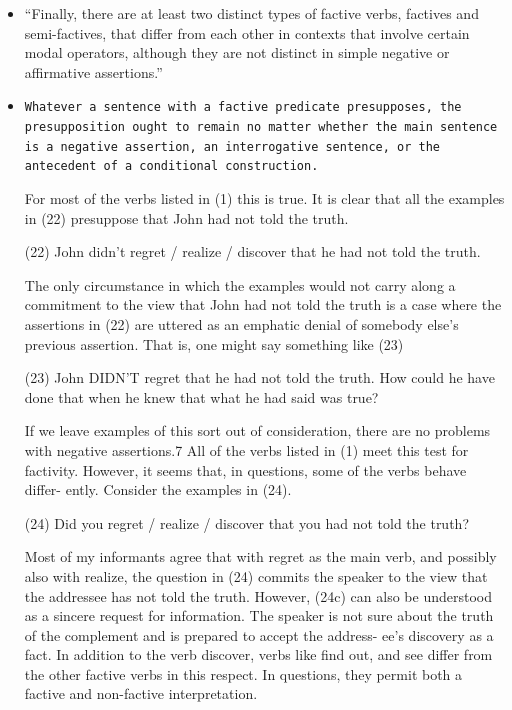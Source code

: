 \documentclass[11pt,fleqn]{article}
\newcommand{\6}{\mbox{$[\hspace*{-.6mm}[$}}
\newcommand{\9}{\mbox{$]\hspace*{-.6mm}]$}}
\begin{document}
\begin{itemize}

\item \citealt[65]{karttunen71b}

``Finally, there are at least two distinct types of factive verbs, factives and semi-factives, that differ from each other in contexts that involve certain modal operators, although they are not distinct in simple negative or affirmative assertions.''

\item \citealt[63ff.]{karttunen71b}

{\tt Whatever a sentence with a factive predicate presupposes, the presupposition ought to remain no matter whether the
main sentence is a negative assertion, an interrogative sentence, or the antecedent of a conditional construction.

For most of the verbs listed in (1) this is true. It is clear that all the examples in (22) presuppose that John had not told the truth.

(22) John didn't regret / realize / discover that he had not told the truth.

The only circumstance in which the examples would not carry along a commitment to the view that John had not told the truth is a case where the assertions in (22) are uttered as an emphatic denial of somebody else's previous assertion. That is, one might say something like (23)

(23) John DIDN'T regret that he had not told the truth. How could he have done that when he knew that what he had said was true?

If we leave examples of this sort out of consideration, there are no problems with negative assertions.7 All of the verbs listed in (1) meet this test for factivity. However, it seems that, in questions, some of the verbs behave differ- ently. Consider the examples in (24).

(24) Did you regret / realize / discover that you had not told the truth?

Most of my informants agree that with regret as the main verb, and possibly also with realize, the question in (24) commits the speaker to the view that the addressee has not told the truth. However, (24c) can also be understood as a sincere request for information. The speaker is not sure about the truth of the complement and is prepared to accept the address- ee's discovery as a fact. In addition to the verb discover, verbs like find out, and see differ from the other factive verbs in this respect. In questions, they permit both a factive and non-factive interpretation.

}
\end{itemize}
\end{document}
